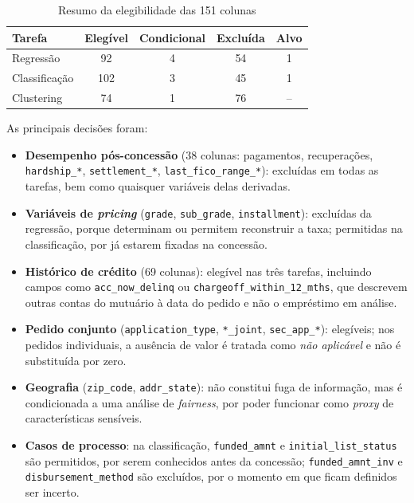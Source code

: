 \begin{table}[!t]
\caption{Resumo da elegibilidade das 151 colunas}
\label{tab:elegibilidade}
\centering
\footnotesize
\begin{tabular}{|l|c|c|c|c|}
\hline
\textbf{Tarefa} & \textbf{Elegível} & \textbf{Condicional} & \textbf{Excluída} & \textbf{Alvo} \\
\hline
Regressão & 92 & 4 & 54 & 1 \\
\hline
Classificação & 102 & 3 & 45 & 1 \\
\hline
Clustering & 74 & 1 & 76 & -- \\
\hline
\end{tabular}
\end{table}

As principais decisões foram:
{\sloppy
\begin{itemize}
  \item \textbf{Desempenho pós-concessão} (38 colunas: pagamentos, recuperações, \texttt{hardship\_*}, \texttt{settlement\_*}, \texttt{last\_fico\_range\_*}): excluídas em todas as tarefas, bem como quaisquer variáveis delas derivadas.
  \item \textbf{Variáveis de \textit{pricing}} (\texttt{grade}, \texttt{sub\_grade}, \texttt{installment}): excluídas da regressão, porque determinam ou permitem reconstruir a taxa; permitidas na classificação, por já estarem fixadas na concessão.
  \item \textbf{Histórico de crédito} (69 colunas): elegível nas três tarefas, incluindo campos como \texttt{acc\_now\_delinq} ou \texttt{chargeoff\_within\_12\_mths}, que descrevem outras contas do mutuário à data do pedido e não o empréstimo em análise.
  \item \textbf{Pedido conjunto} (\texttt{application\_type}, \texttt{*\_joint}, \texttt{sec\_app\_*}): elegíveis; nos pedidos individuais, a ausência de valor é tratada como \textit{não aplicável} e não é substituída por zero.
  \item \textbf{Geografia} (\texttt{zip\_code}, \texttt{addr\_state}): não constitui fuga de informação, mas é condicionada a uma análise de \textit{fairness}, por poder funcionar como \textit{proxy} de características sensíveis.
  \item \textbf{Casos de processo}: na classificação, \texttt{funded\_amnt} e \texttt{initial\_list\_status} são permitidos, por serem conhecidos antes da concessão; \texttt{funded\_amnt\_inv} e \texttt{disbursement\_method} são excluídos, por o momento em que ficam definidos ser incerto.
\end{itemize}\par}


